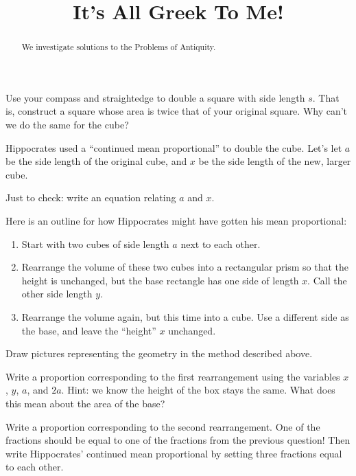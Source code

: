 \documentclass[handout]{ximera}
\title{It's All Greek To Me!}
\begin{document}
\begin{abstract}
    We investigate solutions to the Problems of Antiquity.
\end{abstract}
\maketitle

\begin{question}
Use your compass and straightedge to double a square with side length $s$.  That is, construct a square whose area is twice that of your original square.  Why can't we do the same for the cube?
\end{question}

Hippocrates used a ``continued mean proportional'' to double the cube.  Let's let $a$ be the side length of the original cube, and $x$ be the side length of the new, larger cube.

\begin{question}
Just to check: write an equation relating $a$ and $x$.
\end{question}

Here is an outline for how Hippocrates might have gotten his mean proportional: 
\begin{enumerate}
    \item Start with two cubes of side length $a$ next to each other.
    \item Rearrange the volume of these two cubes into a rectangular prism so that the height is unchanged, but the base rectangle has one side of length $x$.  Call the other side length $y$.
    \item Rearrange the volume again, but this time into a cube.  Use a different side as the base, and leave the ``height'' $x$ unchanged.
\end{enumerate}

\begin{question}
Draw pictures representing the geometry in the method described above.
\end{question}

\begin{question}
Write a proportion corresponding to the first rearrangement using the variables $x$, $y$, $a$, and $2a$.  Hint: we know the height of the box stays the same.  What does this mean about the area of the base?
\end{question}

\begin{question}
Write a proportion corresponding to the second rearrangement.  One of the fractions should be equal to one of the fractions from the previous question!  Then write Hippocrates' continued mean proportional by setting three fractions equal to each other.
\end{question}
\end{document}

